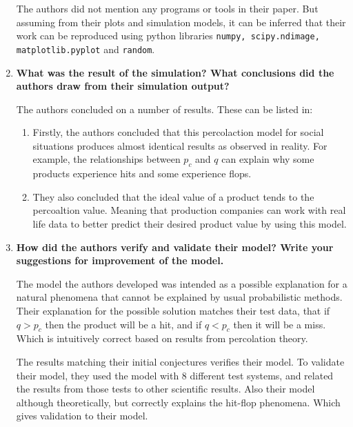 \documentclass[article, 11pt, a4paper]{memoir}
\begin{document}
\begin{enumerate}[left=0pt, itemsep=20pt, label={\(\square\)}]
        The authors did not mention any programs or tools in their paper. But assuming
        from their plots and simulation models, it can be inferred that their work can be
        reproduced using python libraries \texttt{numpy, scipy.ndimage, matplotlib.pyplot}
        and \texttt{random}.

    \item \textbf{What was the result of the simulation? What conclusions did the authors
        draw from their simulation output?}

        The authors concluded on a number of results. These can be listed in:
        \begin{enumerate}[left=0pt, itemsep=0pt]
            \item Firstly, the authors concluded that this percolaction model for social
                situations produces almost identical results as observed in reality. For
                example, the relationships between \(p_c\) and \(q\) can explain why some
                products experience hits and some experience flops.
            \item They also concluded that the ideal value of a product tends to the
                percoaltion value. Meaning that production companies can work with real
                life data to better predict their desired product value by using this
                model.
        \end{enumerate}


    \item \textbf{How did the authors verify and validate their model? Write your
        suggestions for improvement of the model.}

        The model the authors developed was intended as a possible explanation for a
        natural phenomena that cannot be explained by usual probabilistic methods. Their
        explanation for the possible solution matches their test data, that if \(q > p_c\)
        then the product will be a hit, and if \(q < p_c\) then it will be a miss. Which
        is intuitively correct based on results from percolation theory. 

        The results matching their initial conjectures verifies their model. To validate
        their model, they used the model with 8 different test systems, and related the
        results from those tests to other scientific results. Also their model
        although theoretically, but correctly explains the hit-flop phenomena. Which gives
        validation to their model.



\end{enumerate}
\end{document}

